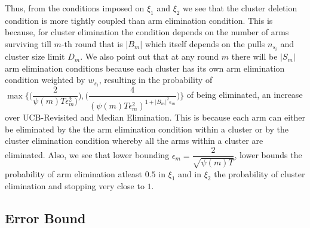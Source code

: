 \begin{remark}
	Thus, from the conditions imposed on $\xi_{1}$ and $\xi_{2}$ we see that the cluster deletion condition is more tightly coupled than arm elimination condition. This is because, for cluster elimination the condition depends on the number of arms surviving till $m$-th round that is $|B_{m}|$ which itself depends on the pulls $n_{s_{i}}$ and cluster size limit $D_{m}$. We also point out that at any round $m$ there will be $|S_{m}|$ arm elimination conditions because each cluster has its own arm elimination condition weighted by $w_{s_{i}}$, resulting in the probability of $\max{\bigg\lbrace \bigg(\dfrac{2}{\psi(m)T\epsilon_{m}^{2})}\bigg) ,\bigg(\dfrac{4}{(\psi(m)T\epsilon_{m}^{2})^{1+|B_{m}|^{2}\epsilon_{m}}}\bigg)\bigg\rbrace}$ of being eliminated, an increase over UCB-Revisited and Median Elimination. This is because each arm can either be eliminated by the the arm elimination condition within a cluster or by the cluster elimination condition whereby all the arms within a cluster are eliminated. Also, we 
see that lower bounding $\epsilon_{m}=\dfrac{2}{\sqrt{\psi(m)T}}$, lower bounds the probability of arm elimination atleast $0.5$ in $\xi_{1}$ and in $\xi_{2}$ the probability of cluster elimination and stopping very close to $1$.
\end{remark}



\subsection{Error Bound}
	
